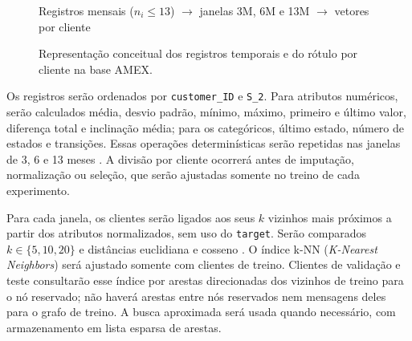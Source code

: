 \documentclass[conference]{IEEEtran}
\begin{document}
\begin{figure}[htbp]
    \centering
    \scriptsize
    \renewcommand{\arraystretch}{1.1}
    \vspace{0.5mm}

    Registros mensais ($n_i \leq 13$) $\rightarrow$ janelas 3M, 6M e 13M $\rightarrow$ vetores por cliente
    \vspace{-1mm}
    \caption{Representação conceitual dos registros temporais e do rótulo por cliente na base AMEX.}
    \label{fig:amex-sample}
\end{figure}

Os registros serão ordenados por \texttt{customer\_ID} e \texttt{S\_2}. Para atributos numéricos, serão calculados média, desvio padrão, mínimo, máximo, primeiro e último valor, diferença total e inclinação média; para os categóricos, último estado, número de estados e transições. Essas operações determinísticas serão repetidas nas janelas de 3, 6 e 13 meses \cite{shukla2024featureengineering,li2026temporalfeatureengineering,zheng2018feature}. A divisão por cliente ocorrerá antes de imputação, normalização ou seleção, que serão ajustadas somente no treino de cada experimento.

Para cada janela, os clientes serão ligados aos seus $k$ vizinhos mais próximos a partir dos atributos normalizados, sem uso do \texttt{target}. Serão comparados $k\in\{5,10,20\}$ e distâncias euclidiana e cosseno \cite{SUN2025763}. O índice k-NN (\textit{K-Nearest Neighbors}) será ajustado somente com clientes de treino. Clientes de validação e teste consultarão esse índice por arestas direcionadas dos vizinhos de treino para o nó reservado; não haverá arestas entre nós reservados nem mensagens deles para o grafo de treino. A busca aproximada será usada quando necessário, com armazenamento em lista esparsa de arestas.
\end{document}
